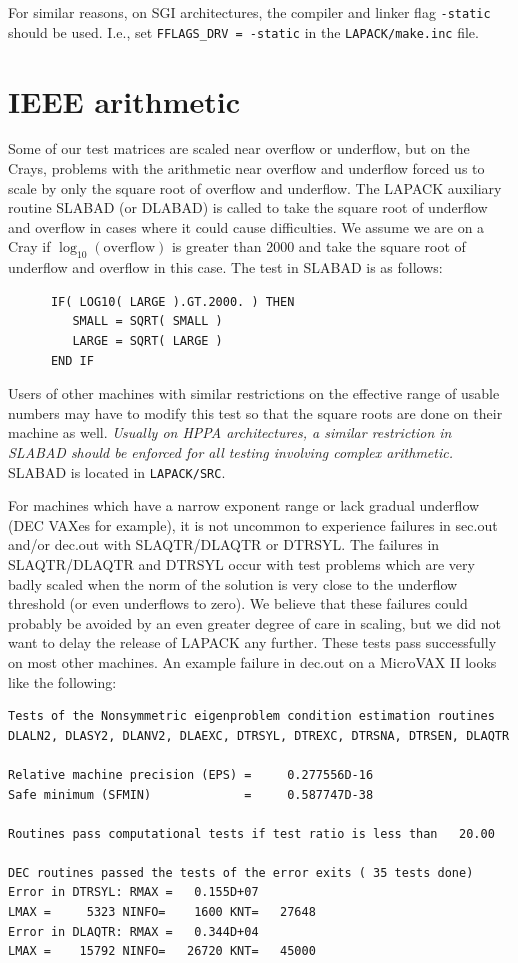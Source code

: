 \documentclass[11pt]{report}
\begin{document}
For similar reasons,
on SGI architectures, the compiler and linker flag \texttt{-static} should be
used.  I.e., set \texttt{FFLAGS\_DRV = -static} in the \texttt{LAPACK/make.inc} file.

\section{IEEE arithmetic}

Some of our test matrices are scaled near overflow or underflow,
but on the Crays, problems with the arithmetic near overflow and
underflow forced us to scale by only the square root of overflow
and underflow.
The LAPACK auxiliary routine SLABAD (or DLABAD) is called to
take the square root of underflow and overflow in cases where it
could cause difficulties.
We assume we are on a Cray if $ \log_{10} (\mathrm{overflow})$
is greater than 2000
and take the square root of underflow and overflow in this case.
The test in SLABAD is as follows:
\begin{verbatim}
      IF( LOG10( LARGE ).GT.2000. ) THEN
         SMALL = SQRT( SMALL )
         LARGE = SQRT( LARGE )
      END IF
\end{verbatim}
Users of other machines with similar restrictions on the effective
range of usable numbers may have to modify this test so that the
square roots are done on their machine as well.  \emph{Usually on
HPPA architectures, a similar restriction in SLABAD should be enforced
for all testing involving complex arithmetic.}
SLABAD is located in \texttt{LAPACK/SRC}.

For machines which have a narrow exponent range or lack gradual
underflow (DEC VAXes for example), it is not uncommon to experience
failures in sec.out and/or dec.out with SLAQTR/DLAQTR or DTRSYL.
The failures in SLAQTR/DLAQTR and DTRSYL
occur with test problems which are very badly scaled when the norm of
the solution is very close to the underflow
threshold (or even underflows to zero).  We believe that these failures
could probably be avoided by an even greater degree of care in scaling,
but we did not want to delay the release of LAPACK any further.  These
tests pass successfully on most other machines.  An example failure in
dec.out on a MicroVAX II looks like the following:

\begin{verbatim}
Tests of the Nonsymmetric eigenproblem condition estimation routines
DLALN2, DLASY2, DLANV2, DLAEXC, DTRSYL, DTREXC, DTRSNA, DTRSEN, DLAQTR

Relative machine precision (EPS) =     0.277556D-16
Safe minimum (SFMIN)             =     0.587747D-38

Routines pass computational tests if test ratio is less than   20.00

DEC routines passed the tests of the error exits ( 35 tests done)
Error in DTRSYL: RMAX =   0.155D+07
LMAX =     5323 NINFO=    1600 KNT=   27648
Error in DLAQTR: RMAX =   0.344D+04
LMAX =    15792 NINFO=   26720 KNT=   45000
\end{verbatim}
\end{document}
